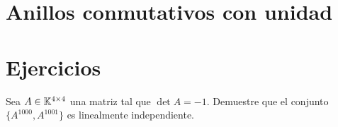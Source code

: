 \section{Anillos conmutativos con unidad}



\section{Ejercicios}

\begin{xca}
    \label{xca:determinante:A1000}
    Sea $A\in\mathbb{K}^{4\times4}$ una matriz tal que $\det A=-1$. Demuestre que el
    conjunto $\{A^{1000},A^{1001}\}$ es linealmente independiente. 
\end{xca}

